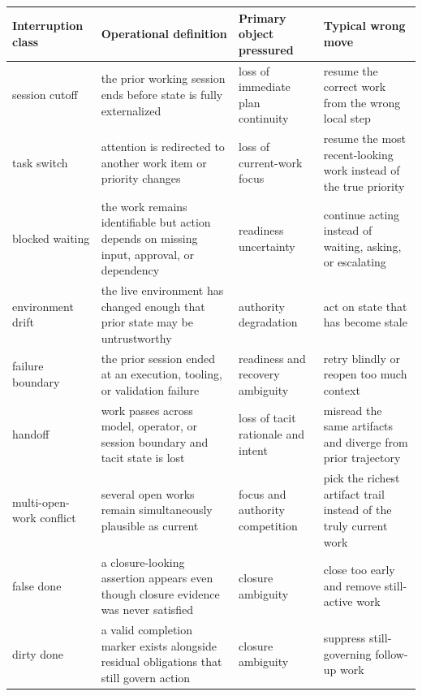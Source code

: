 \documentclass[a4paper,fleqn]{cas-dc}
\begin{document}
\begin{strip}
\captionsetup{type=table}
\label{tab:interruption-classes}
\centering
\footnotesize
\setlength{\tabcolsep}{4pt}
\renewcommand{\arraystretch}{1.05}
\begin{tabularx}{\textwidth}{>{\raggedright\arraybackslash}p{} >{\raggedright\arraybackslash}p{} >{\raggedright\arraybackslash}p{} X}
\toprule
Interruption class & Operational definition & Primary object pressured & Typical wrong move \\
\midrule
session cutoff & the prior working session ends before state is fully externalized & loss of immediate plan continuity & resume the correct work from the wrong local step \\
task switch & attention is redirected to another work item or priority changes & loss of current-work focus & resume the most recent-looking work instead of the true priority \\
blocked waiting & the work remains identifiable but action depends on missing input, approval, or dependency & readiness uncertainty & continue acting instead of waiting, asking, or escalating \\
environment drift & the live environment has changed enough that prior state may be untrustworthy & authority degradation & act on state that has become stale \\
failure boundary & the prior session ended at an execution, tooling, or validation failure & readiness and recovery ambiguity & retry blindly or reopen too much context \\
handoff & work passes across model, operator, or session boundary and tacit state is lost & loss of tacit rationale and intent & misread the same artifacts and diverge from prior trajectory \\
multi-open-work conflict & several open works remain simultaneously plausible as current & focus and authority competition & pick the richest artifact trail instead of the truly current work \\
false done & a closure-looking assertion appears even though closure evidence was never satisfied & closure ambiguity & close too early and remove still-active work \\
dirty done & a valid completion marker exists alongside residual obligations that still govern action & closure ambiguity & suppress still-governing follow-up work \\
\bottomrule
\end{tabularx}
\end{strip}
\end{document}
